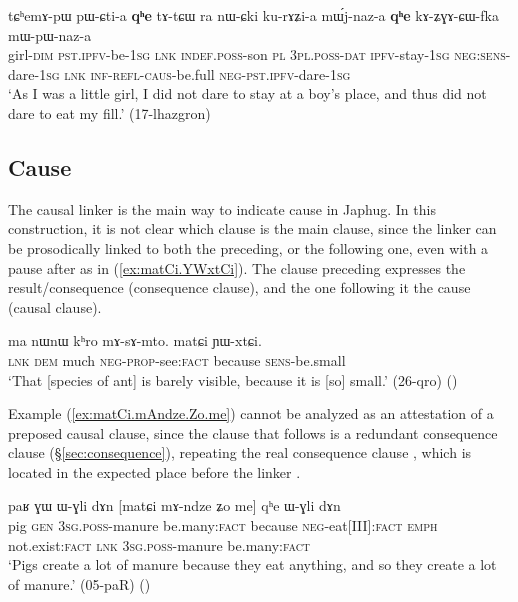 \begin{exe}
\ex \label{ex:pWCtia.qhe.qhe}
\gll tɕʰemɤ-pɯ pɯ-ɕti-a \textbf{qʰe} tɤ-tɕɯ ra nɯ-ɕki ku-rɤʑi-a mɯ́j-naz-a \textbf{qʰe} kɤ-ʑɣɤ-ɕɯ-fka mɯ-pɯ-naz-a \\
girl-\textsc{dim} \textsc{pst}.\textsc{ipfv}-be-\textsc{1sg} \textsc{lnk} \textsc{indef}.\textsc{poss}-son \textsc{pl} \textsc{3pl}.\textsc{poss}-\textsc{dat} \textsc{ipfv}-stay-\textsc{1sg} \textsc{neg}:\textsc{sens}-dare-\textsc{1sg} \textsc{lnk} \textsc{inf}-\textsc{refl}-\textsc{caus}-be.full \textsc{neg}-\textsc{pst}.\textsc{ipfv}-dare-\textsc{1sg} \\
\glt `As I was a little girl, I did not dare to stay at a boy's place, and thus did not dare to eat my fill.' (17-lhazgron)
\end{exe}
 
 \subsection{Cause} \label{sec:causal.clauses}
The causal linker  is the main way to indicate cause in Japhug. In this construction, it is not clear which clause is the main clause, since the linker can be prosodically linked to both the preceding, or the following one, even with a pause after  as in (\ref{ex:matCi.YWxtCi}). The clause preceding  expresses the result/consequence (consequence clause), and the one following it the cause (causal clause).


\begin{exe}
\ex \label{ex:matCi.YWxtCi}
\gll ma nɯnɯ kʰro mɤ-sɤ-mto. matɕi ɲɯ-xtɕi. \\
\textsc{lnk} \textsc{dem} much \textsc{neg}-\textsc{prop}-see:\textsc{fact} because \textsc{sens}-be.small \\
\glt `That [species of ant] is barely visible, because it is [so] small.'  (26-qro)
()
\end{exe} 

Example (\ref{ex:matCi.mAndze.Zo.me}) cannot be analyzed as an attestation of a preposed  causal clause, since the clause that follows  is a redundant consequence clause (§\ref{sec:consequence}), repeating the real consequence clause , which is located in the expected place before the linker .


\begin{exe}
\ex \label{ex:matCi.mAndze.Zo.me}
\gll paʁ ɣɯ ɯ-ɣli dɤn [matɕi mɤ-ndze ʑo me] qʰe ɯ-ɣli dɤn  \\
pig \textsc{gen} \textsc{3sg}.\textsc{poss}-manure be.many:\textsc{fact} because \textsc{neg}-eat[III]:\textsc{fact} \textsc{emph} not.exist:\textsc{fact} \textsc{lnk} \textsc{3sg}.\textsc{poss}-manure  be.many:\textsc{fact} \\
\glt `Pigs create a lot of manure because they eat anything, and so they create a lot of manure.' (05-paR)
()
\end{exe}

